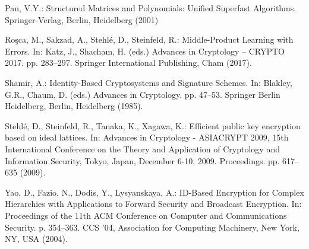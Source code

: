 \documentclass[runningheads]{llncs}
\begin{document}
\begin{thebibliography}{10}
	Pan, V.Y.: Structured Matrices and Polynomials: Unified Superfast Algorithms.
	Springer-Verlag, Berlin, Heidelberg (2001)
	
	Ro{\c{s}}ca, M., Sakzad, A., Stehl{\'e}, D., Steinfeld, R.: {Middle-Product
		Learning with Errors}. In: Katz, J., Shacham, H. (eds.) Advances in
	Cryptology -- CRYPTO 2017. pp. 283--297. Springer International Publishing,
	Cham (2017). 
	
	Shamir, A.: {Identity-Based Cryptosystems and Signature Schemes}. In: Blakley,
	G.R., Chaum, D. (eds.) Advances in Cryptology. pp. 47--53. Springer Berlin
	Heidelberg, Berlin, Heidelberg (1985). 
	
	Stehl{\'{e}}, D., Steinfeld, R., Tanaka, K., Xagawa, K.: Efficient public key
	encryption based on ideal lattices. In: Advances in Cryptology - {ASIACRYPT}
	2009, 15th International Conference on the Theory and Application of
	Cryptology and Information Security, Tokyo, Japan, December 6-10, 2009.
	Proceedings. pp. 617--635 (2009). 
	
	Yao, D., Fazio, N., Dodis, Y., Lysyanskaya, A.: {ID-Based Encryption for
		Complex Hierarchies with Applications to Forward Security and Broadcast
		Encryption}. In: Proceedings of the 11th ACM Conference on Computer and
	Communications Security. p. 354–363. CCS ’04, Association for Computing
	Machinery, New York, NY, USA (2004). 
	
\end{thebibliography}
\end{document}

